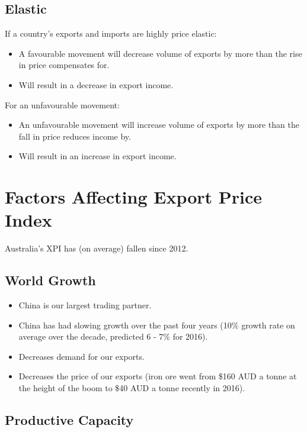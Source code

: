 \documentclass[a4paper,11pt]{report}
\begin{document}
\subsection{Elastic}

If a country's exports and imports are highly price elastic:

\begin{itemize}
\item A favourable movement will decrease volume of exports by more than the
	rise in price compensates for.
\item Will result in a decrease in export income.
\end{itemize}

For an unfavourable movement:

\begin{itemize}
\item An unfavourable movement will increase volume of exports by more than the
	fall in price reduces income by.
\item Will result in an increase in export income.
\end{itemize}


\section{Factors Affecting Export Price Index}

Australia's XPI has (on average) fallen since 2012.

\subsection{World Growth}

\begin{itemize}
\item China is our largest trading partner.
\item China has had slowing growth over the past four years (10\% growth rate
	on average over the decade, predicted 6 - 7\% for 2016).
\item Decreases demand for our exports.
\item Decreases the price of our exports (iron ore went from \$160 AUD a tonne
	at the height of the boom to \$40 AUD a tonne recently in 2016).
\end{itemize}

\subsection{Productive Capacity}
\end{document}
